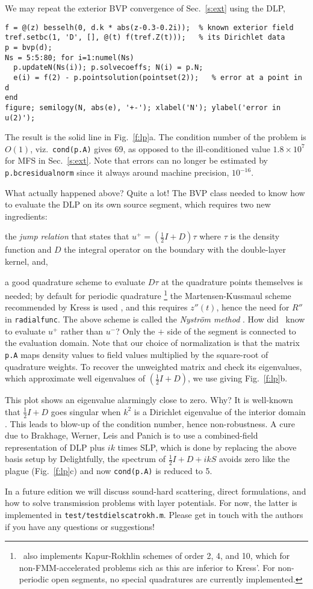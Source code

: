 We may repeat the exterior BVP convergence of Sec.~\ref{s:ext} using the DLP,
\begin{verbatim}
f = @(z) besselh(0, d.k * abs(z-0.3-0.2i));  % known exterior field
tref.setbc(1, 'D', [], @(t) f(tref.Z(t)));   % its Dirichlet data
p = bvp(d);
Ns = 5:5:80; for i=1:numel(Ns)
  p.updateN(Ns(i)); p.solvecoeffs; N(i) = p.N;
  e(i) = f(2) - p.pointsolution(pointset(2));   % error at a point in d
end
figure; semilogy(N, abs(e), '+-'); xlabel('N'); ylabel('error in u(2)');
\end{verbatim}
The result is the solid line in Fig.~\ref{f:lp}a.
The condition number of the problem is $O(1)$, viz.\ {\tt cond(p.A)} gives
69, as opposed to the ill-conditioned value
$1.8\times 10^7$ for MFS in Sec.~\ref{s:ext}.
Note that errors can no longer be estimated by {\tt p.bcresidualnorm} since it
always around machine precision, $10^{-16}$.

What actually happened above? Quite a lot! The BVP class needed to know how
to evaluate the DLP on its own source segment, which requires two new
ingredients:
\ben
\item the {\em jump relation} that states that
$u^+ = (\frac{1}{2}I + D)\tau$ where $\tau$ is the density function and
$D$ the integral operator on the boundary with the double-layer kernel, and,
\item a good quadrature scheme to evaluate $D\tau$ at the quadrature points
themselves is needed; by default for periodic quadrature%
  \footnote{\mpspack\ also implements Kapur-Rokhlin schemes of order 2, 4,
    and 10, which for non-FMM-accelerated problems sich as this are inferior
    to Kress'. For non-periodic open segments, no special quadratures are
    currently implemented.}
the Martensen-Kussmaul scheme recommended by Kress is used \cite{coltonkress},
and this requires $z''(t)$, hence the need for $R''$ in {\tt radialfunc}.
\een
The above scheme is called the {\em Nystr\"{o}m method} \cite{coltonkress}.
How did \mpspack\ know to evaluate $u^+$ rather than $u^-$? Only the
$+$ side of the segment is connected to the evaluation domain.
Note that our choice of normalization is that the matrix
{\tt p.A} maps density values to field values multiplied by the square-root
of quadrature weights. To recover the unweighted matrix and check its
eigenvalues, which approximate well eigenvalues of $(\frac{1}{2}I + D)$,
we use
giving Fig.~\ref{f:lp}b.

This plot shows an eigenvalue alarmingly close to zero. Why?
It is well-known that $\frac{1}{2}I + D$ goes singular when $k^2$ is
a Dirichlet eigenvalue of the interior domain \cite{coltonkress}.
This leads to blow-up of the condition number, hence non-robustness.
A cure due to Brakhage, Werner, Leis and Panich \cite{coltonkress}
is to use a combined-field representation of DLP plus $ik$ times SLP,
which is done by replacing the above basis setup by
Delightfully, the spectrum of $\frac{1}{2}I + D + ikS$ avoids
zero like the plague (Fig.~\ref{f:lp}c) and now {\tt cond(p.A)} is reduced to 5.

In a future edition we will discuss
sound-hard scattering, direct formulations, and
how to solve transmission problems
with layer potentials. For now, the latter
is implemented in {\tt test/testdielscatrokh.m}.
Please get in touch with the authors if you have any questions
or suggestions!
